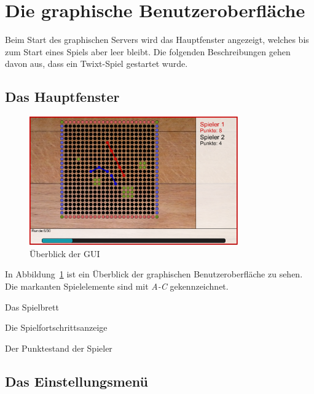 \documentclass[a4paper, ngerman]{scrartcl}
\begin{document}
\section{Die graphische Benutzeroberfläche}

Beim Start des graphischen Servers wird das Hauptfenster angezeigt,
welches bis zum Start eines Spiels aber leer bleibt. Die folgenden
Beschreibungen gehen davon aus, dass ein Twixt-Spiel gestartet wurde.

\subsection{Das Hauptfenster}

\begin{figure}[H]
  \centering
  \includegraphics[width=0.8\textwidth]{bilder/uebersicht.png}
  \caption{Überblick der GUI}\label{fig:GUI}
\end{figure}

\begin{minipage}{\linewidth} %
In Abbildung~\ref{fig:GUI} ist ein Überblick der graphischen Benutzeroberfläche
zu sehen. Die markanten Spielelemente sind mit \emph{A-C} gekennzeichnet.

\begin{compactenum}[A)]
\item Das Spielbrett
\item Die Spielfortschrittsanzeige 
\item Der Punktestand der Spieler
\end{compactenum}
\end{minipage}

\subsection{Das Einstellungsmenü}
\end{document}
